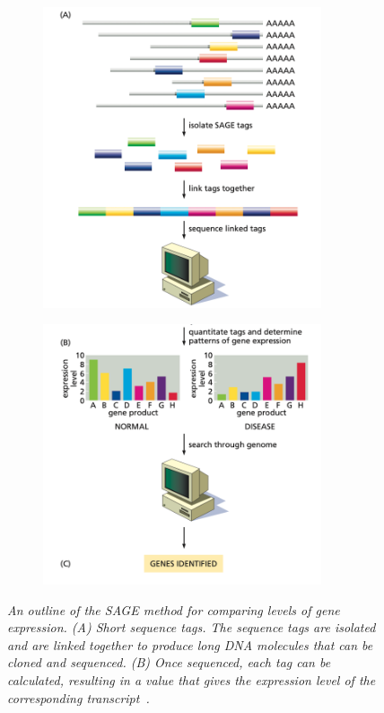 \documentclass{report}
\begin{document}
\begin{figure}[!h]
    \centering
    \begin{subfigure}[t]{.45\textwidth}
        \centering
        \includegraphics[width=0.9\textwidth]{SAGE1.png}
        \caption{}
        \label{fig:SAGE1} 
    \end{subfigure}
    \begin{subfigure}[t]{.45\textwidth}
       \centering
       \includegraphics[width=0.9\textwidth]{SAGE2.png}
       \caption{}
       \label{fig:SAGE2}
    \end{subfigure}
    \caption{\emph{An outline of the SAGE method for comparing levels of gene expression. (A) Short sequence tags. The sequence tags are isolated and are linked together to produce long DNA molecules that can be cloned and sequenced. (B) Once sequenced, each tag can be calculated, resulting in a value that gives the expression level of the corresponding transcript~\cite{zvelebil_understanding_2008}.}}
    \label{fig:SAGE}
\end{figure}
\end{document}
